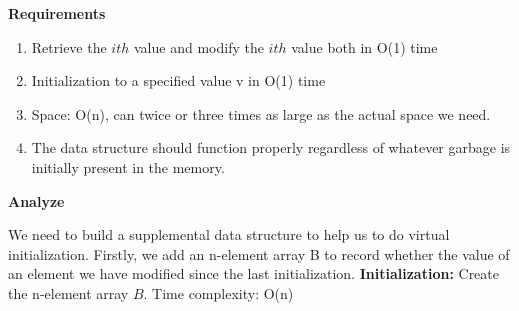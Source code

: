 \begin{homeworkProblem}

\textbf{Requirements}
    \begin{enumerate}
        \item Retrieve the $ith$ value and modify the $ith$ value both in O(1) time
        \item Initialization to a specified value v in O(1) time
        \item Space: O(n), can twice or three times as large as the actual space we need.
        \item The data structure should function properly regardless of whatever garbage is initially present in the memory.
    \end{enumerate}
\textbf{Analyze}

We need to build a supplemental data structure to help us to do virtual initialization. Firstly, we add an n-element array B to record whether the value of an element we have modified since the last initialization.
\textbf{Initialization:} Create the n-element  array $B$. Time complexity: O(n)


\end{homeworkProblem}
